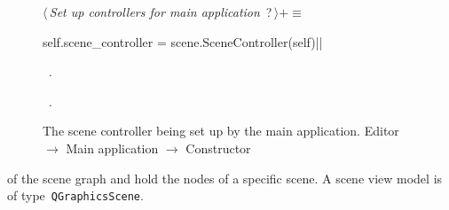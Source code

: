 \documentclass[%
    a4paper,    %
    justified,  %
    nobib,      %
    openany     %
]{tufte-book}
\begin{document}
\begin{figure}
\begin{flushleft} \small
\begin{minipage}{\linewidth}\label{scrap88}\raggedright\small
{} $\langle\,${\itshape Set up controllers for main application}\nobreak\ {\footnotesize {?}}$\,\rangle+\equiv$
\vspace{-1ex}
\begin{pythoncode}
self.scene_controller = scene.SceneController(self)|\NWsep|
\end{pythoncode}
\vspace{1.5ex}
\footnotesize
\begin{list}{}{\setlength{\itemsep}{-\parsep}\setlength{\itemindent}{-\leftmargin}}
\item \NWtxtMacroDefBy\ .
\item \NWtxtMacroRefIn\ .

\item{}
\end{list}
\end{minipage}\vspace{4ex}
\end{flushleft}
\caption{The scene controller being set up by the main application.
  \newline{}\newline{}Editor $\rightarrow$ Main application $\rightarrow$
  Constructor}
\label{editor:lst:main-application:constructor:setup-scene-controller}
\end{figure}

 of the scene graph
and hold the nodes of a specific scene. A scene view model is of
type~\verb=QGraphicsScene=.
\end{document}
